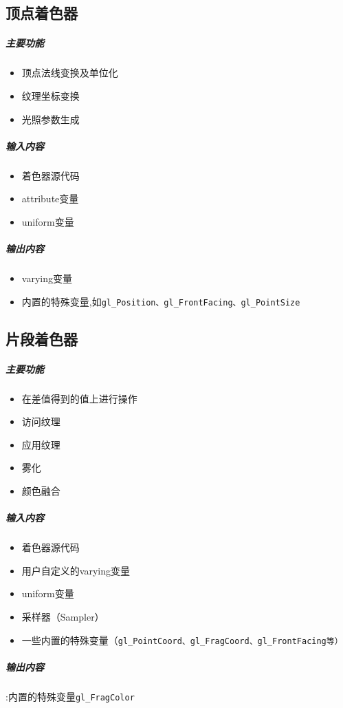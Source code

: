 \documentclass[UTF8,a4paper,8pt]{ctexbook}
\begin{document}
		\subsection{顶点着色器}
			\subparagraph{主要功能}
				\begin{itemize}[itemindent = 1em]
					\item 顶点法线变换及单位化
					\item 纹理坐标变换
					\item 光照参数生成
				\end{itemize}
			\subparagraph{输入内容}
				\begin{itemize}[itemindent = 1em]
					\item 着色器源代码
					\item attribute变量
					\item uniform变量
				\end{itemize}
			\subparagraph{输出内容}
				\begin{itemize}[itemindent = 1em]
					\item varying变量
					\item 内置的特殊变量,如\verb|gl_Position、gl_FrontFacing、gl_PointSize|
				\end{itemize}
		\subsection{片段着色器}
			\subparagraph{主要功能}
				\begin{itemize}[itemindent = 1em]
					\item 在差值得到的值上进行操作
					\item 访问纹理
					\item 应用纹理
					\item 雾化
					\item 颜色融合
				\end{itemize}
			\subparagraph{输入内容}
				\begin{itemize}[itemindent = 1em]
					\item 着色器源代码
					\item 用户自定义的varying变量
					\item uniform变量
					\item 采样器（Sampler）
					\item 一些内置的特殊变量（\verb|gl_PointCoord、gl_FragCoord、gl_FrontFacing等）|	
				\end{itemize}
			\subparagraph{输出内容}:内置的特殊变量\verb|gl_FragColor|
			
\end{document}
